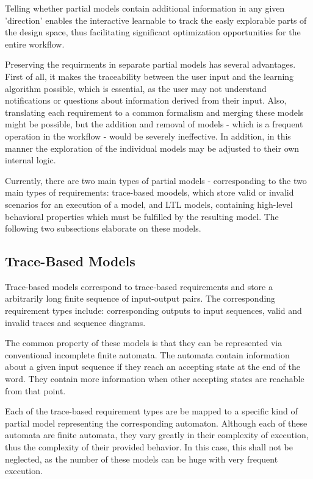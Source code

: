Telling whether partial models contain additional information in any given 'direction' enables the interactive learnable to track the easly explorable parts of the design space, thus facilitating significant optimization opportunities for the entire workflow.

Preserving the requirments in separate partial models has several advantages. First of all, it makes the traceability between the user input and the learning algorithm possible, which is essential, as the user may not understand notifications or questions about information derived from their input. Also, translating each requirement to a common formalism and merging these models might be possible, but the addition and removal of models - which is a frequent operation in the workflow - would be severely ineffective. In addition, in this manner the exploration of the individual models may be adjusted to their own internal logic.

Currently, there are two main types of partial models - corresponding to the two main types of requirements: trace-based moodels, which store valid or invalid scenarios for an execution of a model, and LTL models, containing high-level behavioral properties which must be fulfilled by the resulting model. The following two subsections elaborate on these models. 

\subsection{Trace-Based Models} \label{subs_traceintheframework}

Trace-based models correspond to trace-based requirements and store a arbitrarily long finite sequence of input-output pairs. The corresponding requirement types include: corresponding outputs to input sequences, valid and invalid traces and sequence diagrams. 

The common property of these models is that they can be represented via conventional incomplete finite automata. The automata contain information about a given input sequence if they reach an accepting state at the end of the word. They contain more information when other accepting states are reachable from that point.

Each of the trace-based requirement types are be mapped to a specific kind of partial model representing the corresponding automaton. Although each of these automata are finite automata, they vary greatly in their complexity of execution, thus the complexity of their provided behavior. In this case, this shall not be neglected, as the number of these models can be huge with very frequent execution.

